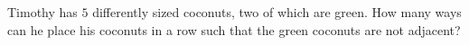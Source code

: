 Timothy has $5$ differently sized coconuts, two of which are green. How many ways can he place his coconuts in a row such that the green coconuts are not adjacent?
